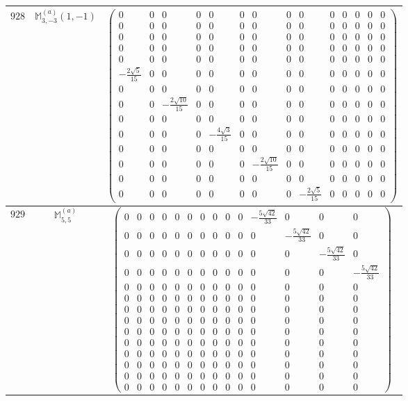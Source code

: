 \documentclass[fleqn,8pt,landscape]{jsarticle}
\begin{document}
\begin{center}
\begin{longtable}{ccc}
$ 928 $ & $ \mathbb{M}_{3,-3}^{(a)}(1,-1) $ & $ \begin{pmatrix} 0 & 0 & 0 & 0 & 0 & 0 & 0 & 0 & 0 & 0 & 0 & 0 & 0 & 0 \\ 0 & 0 & 0 & 0 & 0 & 0 & 0 & 0 & 0 & 0 & 0 & 0 & 0 & 0 \\ 0 & 0 & 0 & 0 & 0 & 0 & 0 & 0 & 0 & 0 & 0 & 0 & 0 & 0 \\ 0 & 0 & 0 & 0 & 0 & 0 & 0 & 0 & 0 & 0 & 0 & 0 & 0 & 0 \\ 0 & 0 & 0 & 0 & 0 & 0 & 0 & 0 & 0 & 0 & 0 & 0 & 0 & 0 \\ - \frac{2 \sqrt{5}}{15} & 0 & 0 & 0 & 0 & 0 & 0 & 0 & 0 & 0 & 0 & 0 & 0 & 0 \\ 0 & 0 & 0 & 0 & 0 & 0 & 0 & 0 & 0 & 0 & 0 & 0 & 0 & 0 \\ 0 & 0 & - \frac{2 \sqrt{10}}{15} & 0 & 0 & 0 & 0 & 0 & 0 & 0 & 0 & 0 & 0 & 0 \\ 0 & 0 & 0 & 0 & 0 & 0 & 0 & 0 & 0 & 0 & 0 & 0 & 0 & 0 \\ 0 & 0 & 0 & 0 & - \frac{4 \sqrt{3}}{15} & 0 & 0 & 0 & 0 & 0 & 0 & 0 & 0 & 0 \\ 0 & 0 & 0 & 0 & 0 & 0 & 0 & 0 & 0 & 0 & 0 & 0 & 0 & 0 \\ 0 & 0 & 0 & 0 & 0 & 0 & - \frac{2 \sqrt{10}}{15} & 0 & 0 & 0 & 0 & 0 & 0 & 0 \\ 0 & 0 & 0 & 0 & 0 & 0 & 0 & 0 & 0 & 0 & 0 & 0 & 0 & 0 \\ 0 & 0 & 0 & 0 & 0 & 0 & 0 & 0 & - \frac{2 \sqrt{5}}{15} & 0 & 0 & 0 & 0 & 0 \end{pmatrix} $ \\ \hline
$ 929 $ & $ \mathbb{M}_{5,5}^{(a)} $ & $ \begin{pmatrix} 0 & 0 & 0 & 0 & 0 & 0 & 0 & 0 & 0 & 0 & - \frac{5 \sqrt{42}}{33} & 0 & 0 & 0 \\ 0 & 0 & 0 & 0 & 0 & 0 & 0 & 0 & 0 & 0 & 0 & - \frac{5 \sqrt{42}}{33} & 0 & 0 \\ 0 & 0 & 0 & 0 & 0 & 0 & 0 & 0 & 0 & 0 & 0 & 0 & - \frac{5 \sqrt{42}}{33} & 0 \\ 0 & 0 & 0 & 0 & 0 & 0 & 0 & 0 & 0 & 0 & 0 & 0 & 0 & - \frac{5 \sqrt{42}}{33} \\ 0 & 0 & 0 & 0 & 0 & 0 & 0 & 0 & 0 & 0 & 0 & 0 & 0 & 0 \\ 0 & 0 & 0 & 0 & 0 & 0 & 0 & 0 & 0 & 0 & 0 & 0 & 0 & 0 \\ 0 & 0 & 0 & 0 & 0 & 0 & 0 & 0 & 0 & 0 & 0 & 0 & 0 & 0 \\ 0 & 0 & 0 & 0 & 0 & 0 & 0 & 0 & 0 & 0 & 0 & 0 & 0 & 0 \\ 0 & 0 & 0 & 0 & 0 & 0 & 0 & 0 & 0 & 0 & 0 & 0 & 0 & 0 \\ 0 & 0 & 0 & 0 & 0 & 0 & 0 & 0 & 0 & 0 & 0 & 0 & 0 & 0 \\ 0 & 0 & 0 & 0 & 0 & 0 & 0 & 0 & 0 & 0 & 0 & 0 & 0 & 0 \\ 0 & 0 & 0 & 0 & 0 & 0 & 0 & 0 & 0 & 0 & 0 & 0 & 0 & 0 \\ 0 & 0 & 0 & 0 & 0 & 0 & 0 & 0 & 0 & 0 & 0 & 0 & 0 & 0 \\ 0 & 0 & 0 & 0 & 0 & 0 & 0 & 0 & 0 & 0 & 0 & 0 & 0 & 0 \end{pmatrix} $ \\ \hline

\end{longtable}
\end{center}
\end{document}
